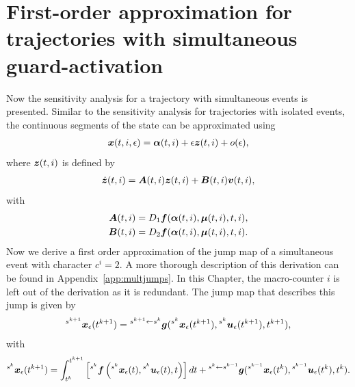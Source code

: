 \documentclass[../DC2017114Bouma.tex]{subfiles}
\begin{document}
%
%
%
%
%
%
%
%
%

\section{First-order approximation for trajectories with simultaneous guard-activation}
Now the sensitivity analysis for a trajectory with simultaneous events is presented. Similar to the sensitivity analysis for trajectories with isolated events, the continuous segments of the state can be approximated using
\begin{align}
{\boldsymbol{x}}(t,i,\epsilon) = \boldsymbol{\alpha}(t,i) + \epsilon{\boldsymbol{z}}(t,i) + o(\epsilon),
\end{align}
where ${\boldsymbol{z}}(t,i)$ is defined by
\begin{align}
\dot{{\boldsymbol{z}}}(t,i) = {\boldsymbol{A}}(t,i){\boldsymbol{z}}(t,i) +{\boldsymbol{B}}(t,i){\boldsymbol{v}}(t,i),
\end{align}
with
\begin{align}
{\boldsymbol{A}}(t,i) &= D_1{\boldsymbol{f}}(\boldsymbol{\alpha}(t,i),\boldsymbol{\mu}(t,i),t,i),\\
{\boldsymbol{B}}(t,i) &= D_2{\boldsymbol{f}}(\boldsymbol{\alpha}(t,i),\boldsymbol{\mu}(t,i),t,i).
\end{align}
Now we derive a first order approximation of the jump map of a simultaneous event with character $c^i = 2$. A more thorough description of this derivation can be found in Appendix~\ref{app:multjumps}. In this Chapter, the macro-counter $i$ is left out of the derivation as it is redundant. The jump map that describes this jump is given by
\begin{align}
\hspace{0cm}^{s^{k+1}}{\boldsymbol{x}}_\epsilon(t^{k+1}) = \hspace{0cm}^{s^{k+1}\leftarrow s^k}{\boldsymbol{g}}(\hspace{0cm}^{s^{k}}{\boldsymbol{x}}_\epsilon(t^{k+1}),\hspace{0cm}^{s^{k}}{\boldsymbol{u}}_\epsilon(t^{k+1}),t^{k+1}),\label{eq:4xe012}
\end{align}
with
\begin{align}
\hspace{0cm}^{s^{k}}{\boldsymbol{x}}_\epsilon(t^{k+1}) = \int_{t^{k}}^{t^{k+1}}\left[\hspace{0cm}^{s^{k}}{\boldsymbol{f}}\left(\hspace{0cm}^{s^{k}}{\boldsymbol{x}}_\epsilon(t),\hspace{0cm}^{s^{k}}{\boldsymbol{u}}_\epsilon(t),t\right)\right]dt + \hspace{0cm}^{s^{k}\leftarrow s^{k-1}}{\boldsymbol{g}}(\hspace{0cm}^{s^{k-1}}{\boldsymbol{x}}_\epsilon(t^{k}),\hspace{0cm}^{s^{k-1}}{\boldsymbol{u}}_\epsilon(t^{k}),t^{k}).\label{eq:4xe01}
\end{align}
\end{document}
